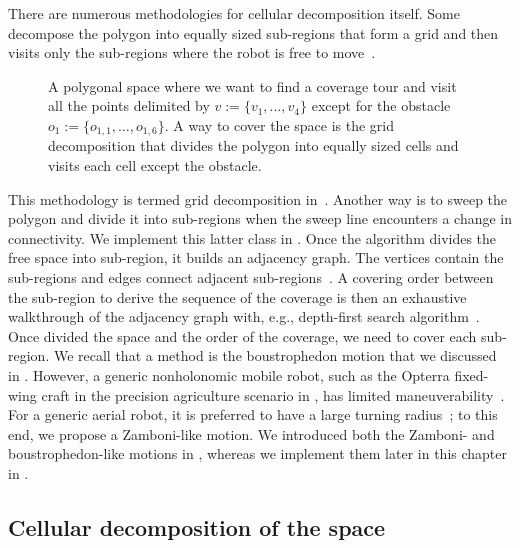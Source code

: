 There are numerous methodologies for cellular decomposition itself. Some decompose the polygon into equally sized sub-regions that form a grid and then visits only the sub-regions where the robot is free to move~\citep{galceran2013survey}. 
\begin{figure}[h!]
  \centering
  \selectfont
  
  \caption[Grid decomposition]{A polygonal space where we want to find a coverage tour and visit all the points delimited by $v:=\{v_1,\dots,v_4\}$ except for the obstacle $o_1:=\{o_{1,1},\dots,o_{1,6}\}$. A way to cover the space is the grid decomposition that divides the polygon into equally sized cells and visits each cell except the obstacle.}
  \label{fig:gride}
\end{figure}
This methodology is termed grid decomposition in~. Another way is to sweep the polygon and divide it into sub-regions when the sweep line encounters a change in connectivity. We implement this latter class in .
Once the algorithm divides the free space into sub-region, it builds an adjacency graph. The vertices contain the sub-regions and edges connect adjacent sub-regions~\citep{choset2005principles}. A covering order between the sub-region to derive the sequence of the coverage is then an exhaustive walkthrough of the adjacency graph with, e.g., depth-first search algorithm~\citep{choset2005principles}. Once divided the space and the order of the coverage, we need to cover each sub-region. We recall that a method is the boustrophedon motion that we discussed in . However, a generic nonholonomic mobile robot, such as the Opterra fixed-wing craft in the precision agriculture scenario in , has limited maneuverability~\citep{mannadiar2010optimal,xu2011optimal,xu2014efficient}. For a generic aerial robot, it is preferred to have a large turning radius~\citep{wang2017curvature}; to this end, we propose a Zamboni-like motion. We introduced both the Zamboni- and boustrophedon-like motions in , whereas we implement them later in this chapter in .

\subsection{Cellular decomposition of the space}
\label{sec:cell-deco}

